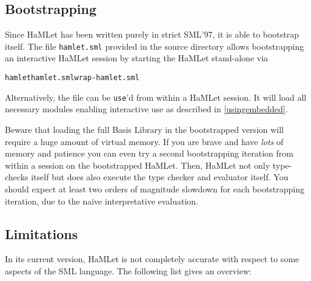 \documentclass[twoside,titlepage]{article}
\begin{document}
\subsection{Bootstrapping}
\label{bootstrapping}

Since HaMLet has been written purely in strict SML'97, it is able to bootstrap itself. The file {\tt hamlet.sml} provided in the source directory allows bootstrapping an interactive HaMLet session by starting the HaMLet stand-alone via

\begin{quoting}
\begin{alltt}
hamlet hamlet.sml wrap-hamlet.sml
\end{alltt}
\end{quoting}

Alternatively, the file can be {\tt use}'d from within a HaMLet session. It will load all necessary modules enabling interactive use as described in \ref{usingembedded}.

Beware that loading the full Basis Library in the bootstrapped version will require a huge amount of virtual memory. If you are brave and have {\em lots} of memory and patience you can even try a second bootstrapping iteration from within a session on the bootstrapped HaMLet. Then, HaMLet not only type-checks itself but does also execute the type checker and evaluator itself. You should expect at least two orders of magnitude slowdown for each bootstrapping iteration, due to the naive interpretative evaluation.


\subsection{Limitations}
\label{limitations}

In its current version, HaMLet is not completely accurate with respect to some aspects of the SML language. The following list gives an overview:
\end{document}
